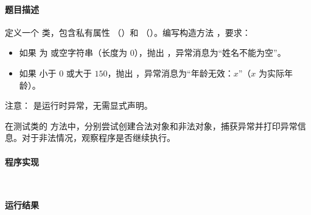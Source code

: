 \documentclass{academics}
\begin{document}
\paragraph{题目描述} {
    定义一个  类，包含私有属性 （）和 （）。编写构造方法 ，要求：
    \begin{itemize}
        \item 如果  为  或空字符串（长度为 $0$），抛出 ，异常消息为``姓名不能为空''。
        \item 如果  小于 $0$ 或大于 $150$，抛出 ，异常消息为``年龄无效：$x$''（$x$ 为实际年龄）。
    \end{itemize}
    注意： 是运行时异常，无需显式声明。

    在测试类的  方法中，分别尝试创建合法对象和非法对象，捕获异常并打印异常信息。对于非法情况，观察程序是否继续执行。
}

\paragraph{程序实现} {
    \inputminted[label=Person.java]{java}{../src/P09/Person.java}
    \inputminted[label=ConstructorTest.java]{java}{../src/P09/ConstructorTest.java}
}

\paragraph{运行结果} {
    \inputminted{text}{../res/P09.out}
}
\end{document}
